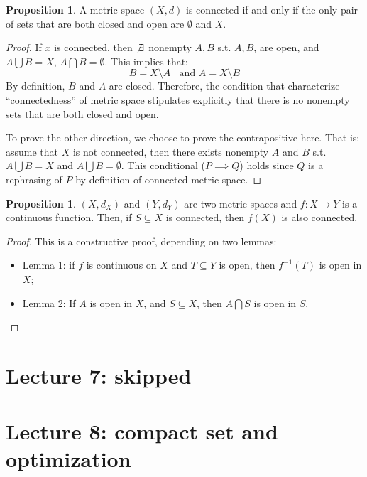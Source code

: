 \documentclass[12pt]{article}
\theoremstyle{definition}
\newtheorem{proposition}[theorem]{Proposition}
\theoremstyle{plain}
\begin{document}
\begin{proposition}
    A metric space $(X, d)$ is connected if and only if the only pair of sets
    that are both closed and open are $\emptyset$ and $X$.
    \begin{proof}
        If $x$ is connected, then $\not\exists$ nonempty $A,B$ s.t. $A, B$, are
        open, and $A \bigcup B = X$, $A \bigcap B = \emptyset$. This implies
        that:
        \[
            B = X\setminus A\;\; \text{ and } A = X \setminus B
        \]
        By definition, $B$ and $A$ are closed. Therefore, the condition that
        characterize ``connectedness'' of metric space stipulates explicitly
        that there is no nonempty sets that are both closed and open.

        To prove the other direction, we choose to prove the contrapositive
        here. That is: assume that $X$ is not connected, then  there exists
        nonempty $A$ and $B$ s.t. $A \bigcup B = X$ and $A \bigcup B =
        \emptyset$. This conditional ($P\implies Q$) holds since $Q$ is a
        rephrasing of $P$ by definition of connected metric space.
    \end{proof}
\end{proposition}

\begin{proposition}
    $(X, d_X)$ and $(Y, d_Y)$ are two metric spaces and $f: X\to Y$ is a
    continuous function. Then, if $S\subseteq X$ is connected, then $f(X)$ is
    also connected.
    \begin{proof}
        This is a constructive proof, depending on two lemmas:
        \begin{itemize}
            \item Lemma 1: if $f$ is continuous on $X$ and $T\subseteq Y$ is
                open,  then $f^{-1}(T)$ is open in $X$;
            \item Lemma 2: If $A$ is open in $X$, and $S \subseteq X$, then $A
                \bigcap S$ is open in $S$.
        \end{itemize}
    \end{proof}
\end{proposition}

\section{Lecture 7: skipped}

\section{Lecture 8: compact set and optimization}
\end{document}
